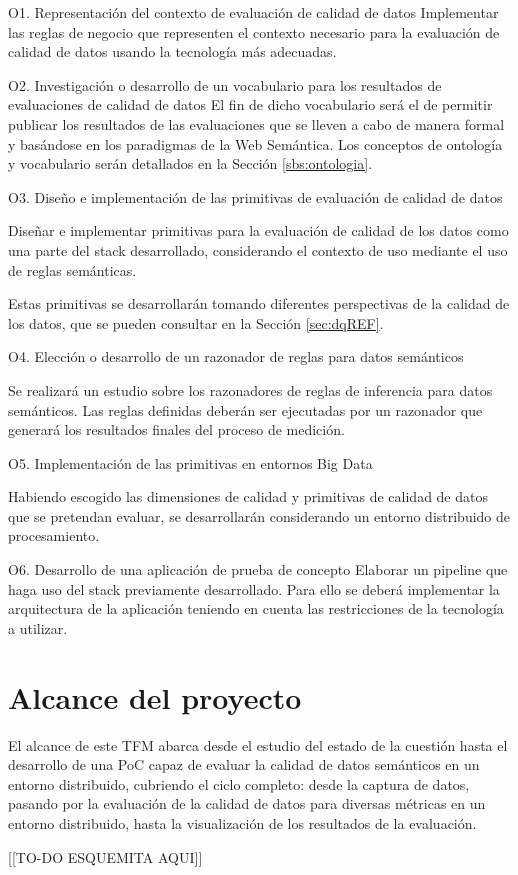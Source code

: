 \begin{definitionlist}
\item[O1. Representación del contexto de evaluación de calidad de datos]
Implementar  las  reglas  de  negocio  que representen el contexto necesario
para la evaluación de
calidad  de datos usando la tecnología más adecuadas.
\label{sec:reglas}

\item[O2. Investigación o desarrollo de un vocabulario para los resultados
  de evaluaciones de calidad de datos]
El fin de dicho vocabulario será el de permitir publicar los
resultados de las evaluaciones que se lleven a cabo de manera formal y basándose
en los paradigmas de la Web Semántica. Los conceptos de ontología y vocabulario
serán detallados en la Sección \ref{sbs:ontologia}. 

\item[O3. Diseño e implementación de las primitivas de evaluación de calidad de datos]

Diseñar e implementar primitivas para la evaluación de calidad de los datos como
una parte del stack desarrollado, considerando el contexto de uso mediante el uso
de reglas semánticas.

Estas primitivas se desarrollarán tomando diferentes perspectivas de la calidad
de los datos, que se pueden consultar en la Sección \ref{sec:dqREF}. 


\item[O4. Elección o desarrollo de un razonador de reglas para datos semánticos]

Se realizará un estudio sobre los razonadores de reglas de inferencia para
datos semánticos. Las reglas definidas deberán ser
ejecutadas por un razonador que generará los resultados finales del proceso de
medición. 

\item[O5. Implementación de las primitivas en entornos Big Data]

Habiendo escogido las dimensiones de calidad y primitivas de calidad de datos
que se pretendan evaluar, se desarrollarán considerando un entorno distribuido
de procesamiento. 

\item[O6. Desarrollo de una aplicación de prueba de concepto]
Elaborar un pipeline que haga uso del stack 
previamente desarrollado. Para ello se deberá implementar la arquitectura de
la aplicación teniendo en cuenta las restricciones de la tecnología a utilizar.

\end{definitionlist}


\section{Alcance del proyecto}

El alcance de este \acs{TFM} abarca desde el estudio del estado de la cuestión
hasta el desarrollo de una \acf{PoC} capaz de evaluar la calidad de datos
semánticos en un entorno distribuido, cubriendo el ciclo completo: desde la
captura de datos, pasando por la evaluación de la calidad de datos para diversas
métricas en un entorno distribuido, hasta la visualización de los resultados de
la evaluación.

[[TO-DO ESQUEMITA AQUI]]
